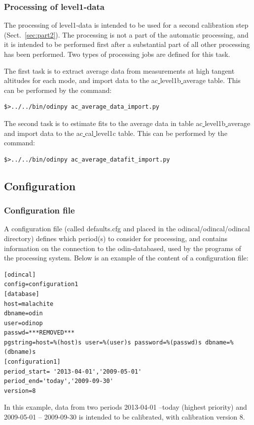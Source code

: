 \documentclass[12pt]{article}
\begin{document}
\subsubsection{Processing of level1-data}
\label{sec:level1processing}

The processing of level1-data is intended to be used for a second
calibration step (Sect.~\ref{sec:part2}). The processing is not a part of 
the automatic processing, and it is intended to be performed first
after a substantial part of all other processing has been performed.
Two types of processing jobs are defined for this task.

The first task is to extract average data from measurements
at high tangent altitudes for each mode, and import data to the
ac\underline{ }level1b\underline{ }average table.
This can be performed by the command:
\begin{verbatim}
$>../../bin/odinpy ac_average_data_import.py
\end{verbatim}

The second task is to estimate fits to the average data
in table ac\underline{ }level1b\underline{ }average
and import data to the ac\underline{ }cal\underline{ }level1c table.
This can be performed by the command:
\begin{verbatim}
$>../../bin/odinpy ac_average_datafit_import.py
\end{verbatim}





\subsection{Configuration}
\subsubsection{Configuration file}
\label{sec:config}
A configuration file (called defaults.cfg and placed
in the odincal/odincal/odincal directory) defines which period(s) to consider
for processing, and contains information on the connection
to the odin-databased, used by the programs of the processing system.
Below is an example of the content of a configuration file:
\begin{verbatim}
[odincal]
config=configuration1
[database]
host=malachite
dbname=odin
user=odinop
passwd=***REMOVED***
pgstring=host=%(host)s user=%(user)s password=%(passwd)s dbname=%(dbname)s
[configuration1]
period_start= '2013-04-01','2009-05-01'
period_end='today','2009-09-30'
version=8
\end{verbatim}
In this example, data from two periods 2013-04-01 --today (highest priority)
and 2009-05-01 -- 2009-09-30
is intended to be calibrated, with calibration version 8.
\end{document}
